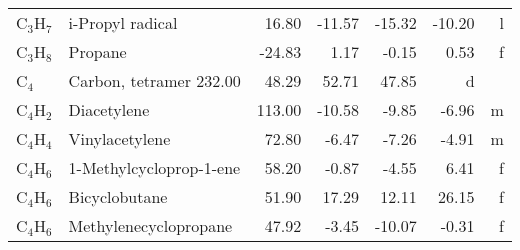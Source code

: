 \begin{table}
\begin{center}
\begin{tabular}{llrrrrr}
 C$_3$H$_7$        & i-Propyl radical               &    16.80    &   -11.57  &   -15.32  &   -10.20  &      l\\
 C$_3$H$_8$        & Propane                        &   -24.83    &     1.17  &    -0.15  &     0.53  &      f\\
 C$_4$          & Carbon, tetramer                   232.00    &    48.29  &    52.71  &    47.85  &      d\\
 C$_4$H$_2$        & Diacetylene                    &   113.00    &   -10.58  &    -9.85  &    -6.96  &      m\\
 C$_4$H$_4$        & Vinylacetylene                 &    72.80    &    -6.47  &    -7.26  &    -4.91  &      m\\
 C$_4$H$_6$        & 1-Methylcycloprop-1-ene        &    58.20    &    -0.87  &    -4.55  &     6.41  &      f\\
 C$_4$H$_6$        & Bicyclobutane                  &    51.90    &    17.29  &    12.11  &    26.15  &      f\\
 C$_4$H$_6$        & Methylenecyclopropane          &    47.92    &    -3.45  &   -10.07  &    -0.31  &      f\\
\hline
\end{tabular}
\end{center}
\end{table}
\clearpage

